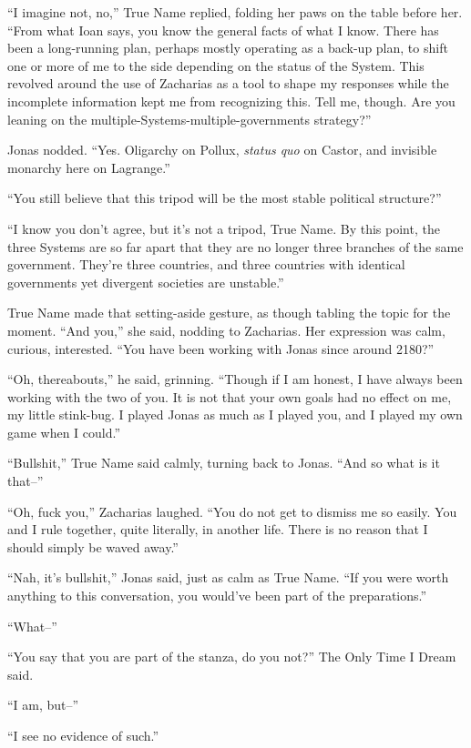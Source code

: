 ``I imagine not, no,'' True Name replied, folding her paws on the table before her. ``From what Ioan says, you know the general facts of what I know. There has been a long-running plan, perhaps mostly operating as a back-up plan, to shift one or more of me to the side depending on the status of the System. This revolved around the use of Zacharias as a tool to shape my responses while the incomplete information kept me from recognizing this. Tell me, though. Are you leaning on the multiple-Systems-multiple-governments strategy?''

Jonas nodded. ``Yes. Oligarchy on Pollux, \emph{status quo} on Castor, and invisible monarchy here on Lagrange.''

``You still believe that this tripod will be the most stable political structure?''

``I know you don't agree, but it's not a tripod, True Name. By this point, the three Systems are so far apart that they are no longer three branches of the same government. They're three countries, and three countries with identical governments yet divergent societies are unstable.''

True Name made that setting-aside gesture, as though tabling the topic for the moment. ``And you,'' she said, nodding to Zacharias. Her expression was calm, curious, interested. ``You have been working with Jonas since around 2180?''

``Oh, thereabouts,'' he said, grinning. ``Though if I am honest, I have always been working with the two of you. It is not that your own goals had no effect on me, my little stink-bug. I played Jonas as much as I played you, and I played my own game when I could.''

``Bullshit,'' True Name said calmly, turning back to Jonas. ``And so what is it that--''

``Oh, fuck you,'' Zacharias laughed. ``You do not get to dismiss me so easily. You and I rule together, quite literally, in another life. There is no reason that I should simply be waved away.''

``Nah, it's bullshit,'' Jonas said, just as calm as True Name. ``If you were worth anything to this conversation, you would've been part of the preparations.''

``What--''

``You say that you are part of the stanza, do you not?'' The Only Time I Dream said.

``I am, but--''

``I see no evidence of such.''

